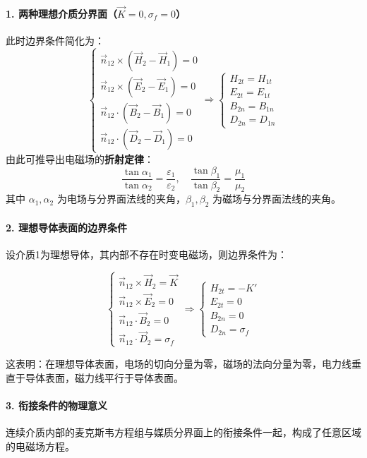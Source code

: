 \paragraph{1. 两种理想介质分界面（$\vec{K}=0, \sigma_f=0$）}
此时边界条件简化为：
\[
\begin{cases}
\vec{n}_{12} \times (\vec{H}_2 - \vec{H}_1) = 0 \\
\vec{n}_{12} \times (\vec{E}_2 - \vec{E}_1) = 0 \\
\vec{n}_{12} \cdot (\vec{B}_2 - \vec{B}_1) = 0 \\
\vec{n}_{12} \cdot (\vec{D}_2 - \vec{D}_1) = 0
\end{cases}
\Rightarrow
\begin{cases}
H_{2t} = H_{1t} \\
E_{2t} = E_{1t} \\
B_{2n} = B_{1n} \\
D_{2n} = D_{1n}
\end{cases}
\]
由此可推导出电磁场的\textbf{折射定律}：
\[
\frac{\tan\alpha_1}{\tan\alpha_2} = \frac{\varepsilon_1}{\varepsilon_2}, \quad
\frac{\tan\beta_1}{\tan\beta_2} = \frac{\mu_1}{\mu_2}
\]
其中 $\alpha_1, \alpha_2$ 为电场与分界面法线的夹角，$\beta_1, \beta_2$ 为磁场与分界面法线的夹角。

\paragraph{2. 理想导体表面的边界条件}
设介质1为理想导体，其内部不存在时变电磁场，则边界条件为：
\begin{formulaBox}
\[
\begin{cases}
\vec{n}_{12} \times \vec{H}_2 = \vec{K} \\
\vec{n}_{12} \times \vec{E}_2 = 0 \\
\vec{n}_{12} \cdot \vec{B}_2 = 0 \\
\vec{n}_{12} \cdot \vec{D}_2 = \sigma_f
\end{cases}
\Rightarrow
\begin{cases}
H_{2t} = -K' \\
E_{2t} = 0 \\
B_{2n} = 0 \\
D_{2n} = \sigma_f
\end{cases}
\]
\end{formulaBox}
这表明：在理想导体表面，电场的切向分量为零，磁场的法向分量为零，电力线垂直于导体表面，磁力线平行于导体表面。

\paragraph{3. 衔接条件的物理意义}
连续介质内部的麦克斯韦方程组与媒质分界面上的衔接条件一起，构成了任意区域的电磁场方程。

